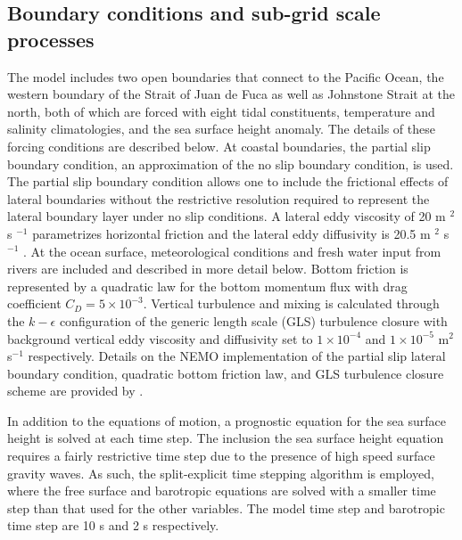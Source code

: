 \documentclass[pdftex,10pt]{article}
\begin{document}
\subsection{Boundary conditions and sub-grid scale processes}
The model includes two open boundaries that connect to the Pacific Ocean, the western boundary of the Strait of Juan de Fuca as well as Johnstone Strait at the north, both of which are forced with eight tidal constituents, temperature and salinity climatologies, and the sea surface height anomaly. The details of these forcing conditions are described below. At coastal boundaries, the partial slip boundary condition, an approximation of the no slip boundary condition, is used. The partial slip boundary condition allows one to include the frictional effects of lateral boundaries without the restrictive resolution required to represent the lateral boundary layer under no slip conditions. A lateral eddy viscosity of 20 m $^2$ s $^{-1}$ parametrizes horizontal friction and the lateral eddy diffusivity is 20.5 m $^2$ s $^{-1}$ . At the ocean surface, meteorological conditions and fresh water input from rivers are included and described in more detail below. Bottom friction is represented by a quadratic law for the bottom momentum flux with drag coefficient $C_D = 5\times 10^{-3}$. Vertical turbulence and mixing is calculated through the $k-\epsilon$ configuration of the generic length scale (GLS) turbulence closure \citep{umlauf2003generic} with background vertical eddy viscosity and diffusivity set to $1\times10^{-4}$ and $1\times10^{-5}$ m$^2$ s$^{-1}$ respectively. Details on the NEMO implementation of the partial slip lateral boundary condition, quadratic bottom friction law, and GLS turbulence closure scheme are provided by \citep{madec2008nemo}.

In addition to the equations of motion, a prognostic equation for the sea surface height is solved at each time step. The inclusion the sea surface height equation requires a fairly restrictive time step due to the presence of high speed surface gravity waves. As such, the split-explicit time stepping algorithm is employed, where the free surface and barotropic equations are solved with a smaller time step than that used for the other variables. The model time step and barotropic time step are 10 s and 2 s respectively. 
\end{document}
